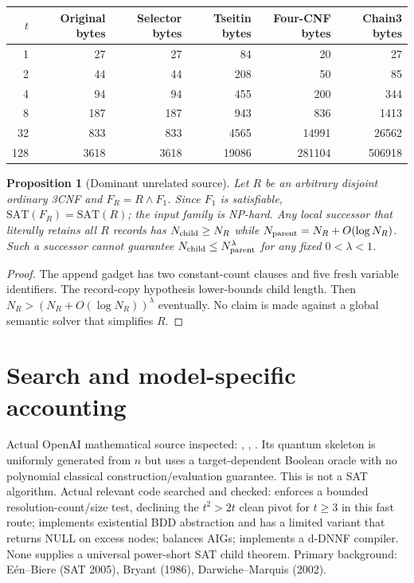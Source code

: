 \documentclass[11pt]{article}
\newtheorem{proposition}[theorem]{Proposition}
\begin{document}
\begin{center}\small
\begin{tabular}{rrrrrr}
\toprule
\(t\)& Original bytes& Selector bytes& Tseitin bytes& Four-CNF bytes& Chain3 bytes\\
\midrule
1&27&27&84&20&27\\
2&44&44&208&50&85\\
4&94&94&455&200&344\\
8&187&187&943&836&1413\\
32&833&833&4565&14991&26562\\
128&3618&3618&19086&281104&506918\\
\bottomrule
\end{tabular}
\end{center}

\begin{proposition}[Dominant unrelated source]
Let \(R\) be an arbitrary disjoint ordinary 3CNF and
\(F_R=R\wedge F_1\). Since \(F_1\) is satisfiable,
\(\mathrm{SAT}(F_R)=\mathrm{SAT}(R)\); the input family is NP-hard.
Any local successor that literally retains all \(R\) records
has \(N_{\rm child}\ge N_R\) while
\(N_{\rm parent}=N_R+O(\log N_R)\). Such a successor
cannot guarantee \(N_{\rm child}\le N_{\rm parent}^\lambda\)
for any fixed \(0<\lambda<1\).
\end{proposition}
\begin{proof}
The append gadget has two constant-count clauses and five fresh variable
identifiers. The record-copy hypothesis lower-bounds child length.
Then \(N_R>(N_R+O(\log N_R))^\lambda\) eventually. No claim is
made against a global semantic solver that simplifies \(R\).
\end{proof}

\section{Search and model-specific accounting}
Actual OpenAI mathematical source inspected:
,
, .
Its quantum skeleton is uniformly generated from \(n\) but
uses a target-dependent Boolean oracle with no polynomial classical
construction/evaluation guarantee. This is not a SAT algorithm.
Actual relevant code searched and checked:
 enforces a bounded
resolution-count/size test, declining the \(t^2>2t\) clean
pivot for \(t\ge3\) in this fast route;
 implements existential BDD
abstraction and has a limited variant that returns NULL on excess
nodes;  balances AIGs;
 implements a d-DNNF compiler. None supplies a
universal power-short SAT child theorem. Primary background:
E\'en--Biere (SAT 2005), Bryant (1986), Darwiche--Marquis (2002).
\end{document}

